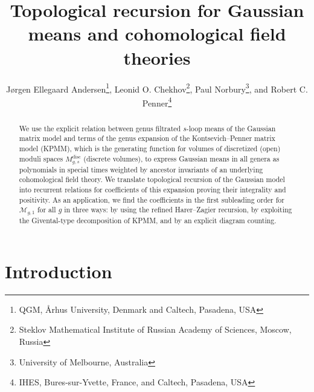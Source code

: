\documentclass[11pt]{article}
\makeatletter
\theoremstyle{plain}
\theoremstyle{definition}
\let\text=\mathrm
\def\disc{\text{disc}}
\let\@@savethanks\thanks
\def\thanks#1{\gdef\thefootnote{\alph{footnote}}\@@savethanks{#1}}
\def\blfootnote{\xdef\@thefnmark{}\@footnotetext}
\makeatother
\begin{document}
\title{Topological recursion for Gaussian means and cohomological field theories}

\author{J{\o}rgen Ellegaard Andersen\thanks{\noindent QGM, {\AA}rhus University, Denmark and Caltech, Pasadena, USA},
Leonid O. Chekhov\thanks{Steklov Mathematical Institute of Russian Academy of Sciences, Moscow, Russia},
Paul Norbury\thanks{University of Melbourne, Australia}, and
Robert C. Penner\thanks{IHES, Bures-sur-Yvette, France, and Caltech, Pasadena, USA}}

\date{}



\maketitle


\begin{abstract}
We use the explicit relation between genus filtrated $s$-loop means 
of the Gaussian matrix model and terms of the genus expansion of the 
Kontsevich--Penner matrix model (KPMM), which is the
generating function for volumes of discretized (open) moduli spaces
$M_{g,s}^{\disc}$ (discrete volumes), to express Gaussian means in all genera as polynomials
in special times weighted by ancestor invariants of an underlying cohomological field theory.
We translate topological recursion of the Gaussian model into recurrent relations for coefficients of this expansion
proving their integrality and positivity. 
As an application, we find the coefficients in the first subleading order for ${\mathcal M}_{g,1}$ for 
all $g$ in three ways:
by using the refined Harer--Zagier recursion, by exploiting the Givental-type decomposition of KPMM, and
by an explicit diagram counting.
\end{abstract}

\section{Introduction}
\setcounter{equation}{0}
\end{document}
